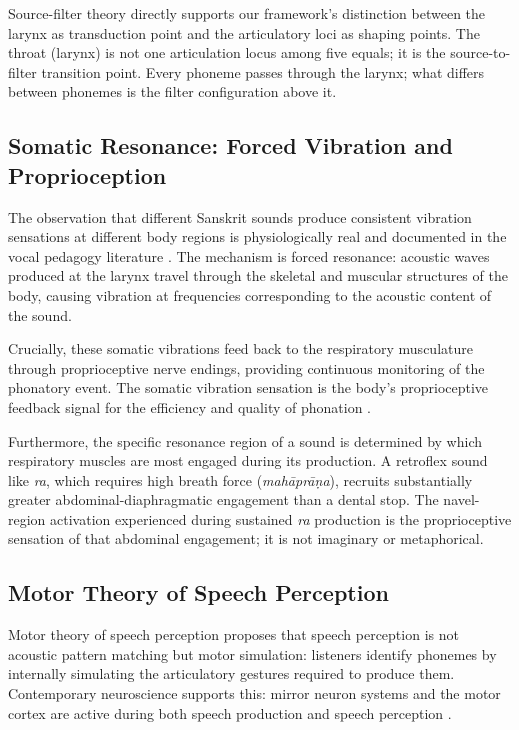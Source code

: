 \documentclass[12pt]{article}
\begin{document}
Source-filter theory directly supports our framework's distinction between the larynx as transduction point and the articulatory loci as shaping points. The throat (larynx) is not one articulation locus among five equals; it is the source-to-filter transition point. Every phoneme passes through the larynx; what differs between phonemes is the filter configuration above it.

\subsection{Somatic Resonance: Forced Vibration and Proprioception}

The observation that different Sanskrit sounds produce consistent vibration sensations at different body regions is physiologically real and documented in the vocal pedagogy literature \cite{sundberg1987, titze1994}. The mechanism is forced resonance: acoustic waves produced at the larynx travel through the skeletal and muscular structures of the body, causing vibration at frequencies corresponding to the acoustic content of the sound.

Crucially, these somatic vibrations feed back to the respiratory musculature through proprioceptive nerve endings, providing continuous monitoring of the phonatory event. The somatic vibration sensation is the body's proprioceptive feedback signal for the efficiency and quality of phonation \cite{titze1994}.

Furthermore, the specific resonance region of a sound is determined by which respiratory muscles are most engaged during its production. A retroflex sound like \textit{ra}, which requires high breath force (\textit{mah\={a}pr\={a}\d{n}a}), recruits substantially greater abdominal-diaphragmatic engagement than a dental stop. The navel-region activation experienced during sustained \textit{ra} production is the proprioceptive sensation of that abdominal engagement; it is not imaginary or metaphorical.

\subsection{Motor Theory of Speech Perception}

Motor theory of speech perception \cite{liberman1967, liberman1985} proposes that speech perception is not acoustic pattern matching but motor simulation: listeners identify phonemes by internally simulating the articulatory gestures required to produce them. Contemporary neuroscience supports this: mirror neuron systems and the motor cortex are active during both speech production and speech perception \cite{wilson2004, pulvermuller2006}.
\end{document}
